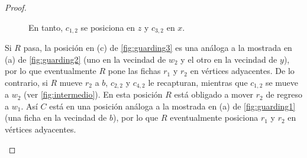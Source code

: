 \begin{proof}
\begin{enumerate}
\begin{enumerate}
            \begin{figure}[ht!]
                \ContinuedFloat
                \begin{tcbitemize}[raster columns=2, raster equal height, enhanced,
                    colback=Black!5!white,colframe=Grey!75!black, attach title to upper,
                    phantom={\addtocounter{myrasternum}{1}},
                    title={(\alph{myrasternum})\enspace}, halign lower=center, halign
                    upper = left, lower separated=false, middle=0mm, boxsep=0mm,
                    leftupper=2mm, left=2mm, right=2mm, fonttitle=\bfseries,
                    coltitle=black, raster column skip=1mm,raster halign=center, raster
                    row skip=1mm]
                    \tcbitem[raster multicolumn=2]
                        \tcblower
                \end{tcbitemize}
                \captionsetup{font=footnotesize}
                \caption{En tanto, $c_{1,2}$ se posiciona en $z$ y $c_{3,2}$ en
                $x$.}
            \end{figure}

            Si $R$ pasa, la posici\'on en (c) de \cref{fig:guarding3} es una
            an\'aloga a la mostrada en (a) de \cref{fig:guarding2} (uno en la
            vecindad de $w_2$ y el otro en la vecindad de $y$), por lo que
            eventualmente $R$ pone las fichas $r_1$ y $r_2$ en v\'ertices
            adyacentes. De lo contrario, si $R$ mueve $r_2$ a $b$, $c_{2,2}$ y
            $c_{4,2}$ le recapturan, mientras que $c_{1,2}$ se mueve a $w_2$
            (ver \cref{fig:intermedio}). En esta posici\'on $R$ est\'a obligado
            a mover $r_2$ de regreso a $w_1$. As\'i $C$ est\'a en una posici\'on
            an\'aloga a la mostrada en (a) de \cref{fig:guarding1} (una ficha en
            la vecindad de $b$), por lo que $R$ eventualmente posiciona $r_1$ y
            $r_2$ en v\'ertices adyacentes.


\end{enumerate}
\end{enumerate}
\end{proof}
